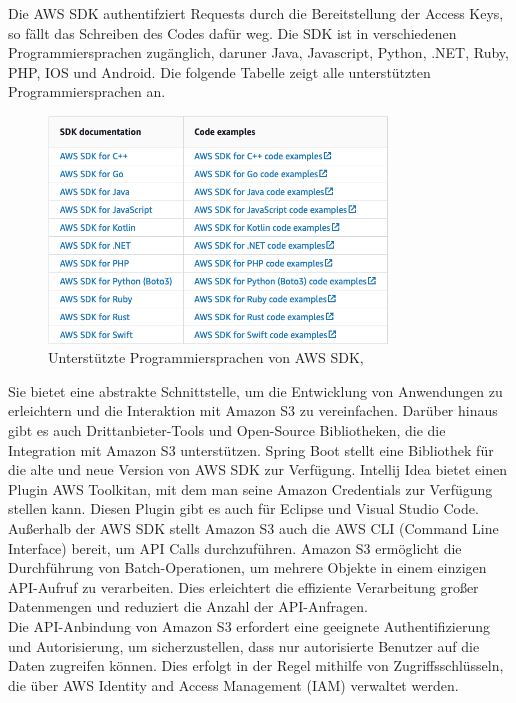 Die AWS SDK authentifziert Requests durch die Bereitstellung der Access Keys, so fällt das Schreiben des Codes dafür weg. Die SDK ist in verschiedenen Programmiersprachen zugänglich, daruner Java, Javascript, Python, .NET, Ruby, PHP, IOS und Android. Die folgende Tabelle zeigt alle unterstützten Programmiersprachen an.

\begin{figure}[h]
\centering
\includegraphics[width=9cm,keepaspectratio]{Pictures/SDKProgrammiersprachen.png}
	\caption{Unterstützte Programmiersprachen von AWS SDK,  }
\end{figure}

Sie bietet eine abstrakte Schnittstelle, um die Entwicklung von Anwendungen zu erleichtern und die Interaktion mit Amazon S3 zu vereinfachen. Darüber hinaus gibt es auch Drittanbieter-Tools und Open-Source Bibliotheken, die die Integration mit Amazon S3 unterstützen. Spring Boot stellt eine Bibliothek für die alte und neue Version von AWS SDK zur Verfügung. Intellij Idea bietet einen Plugin \glqq AWS Toolkit\grqq an, mit dem man seine Amazon Credentials zur Verfügung stellen kann. Diesen Plugin gibt es auch für Eclipse und Visual Studio Code.\\

Außerhalb der AWS SDK stellt Amazon S3 auch die AWS CLI (Command Line Interface) bereit, um API Calls durchzuführen. Amazon S3 ermöglicht die Durchführung von Batch-Operationen, um mehrere Objekte in einem einzigen API-Aufruf zu verarbeiten. Dies erleichtert die effiziente Verarbeitung großer Datenmengen und reduziert die Anzahl der API-Anfragen.\\

Die API-Anbindung von Amazon S3 erfordert eine geeignete Authentifizierung und Autorisierung, um sicherzustellen, dass nur autorisierte Benutzer auf die Daten zugreifen können. Dies erfolgt in der Regel mithilfe von Zugriffsschlüsseln, die über AWS Identity and Access Management (IAM) verwaltet werden.

